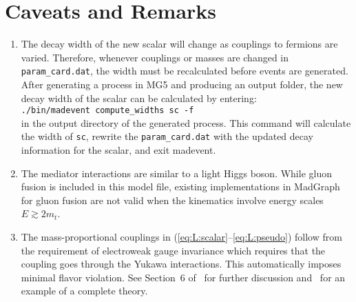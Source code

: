 \documentclass[showpacs,preprintnumbers,amsmath,amssymb]{revtex4}
\begin{document}
\section{Caveats and Remarks}
\begin{enumerate}

\item The decay width of the new scalar will change as couplings to fermions are varied. Therefore, whenever couplings or masses are changed in {\tt param\_card.dat}, the width must be recalculated before events are generated. After generating a process in MG5 and producing an output folder, the new decay width of the scalar can be calculated by entering:\\

{\tt ./bin/madevent compute\_widths sc -f}\\

in the output directory of the generated process. This command will calculate the width of {\tt sc}, rewrite the {\tt param\_card.dat} with the updated decay information for the scalar, and exit madevent.

\item The mediator interactions are similar to a light Higgs boson. While gluon fusion is included in this model file, existing implementations in MadGraph for gluon fusion are not valid when the kinematics involve energy scales $E \gtrsim 2m_t$.

\item The mass-proportional couplings in (\ref{eq:L:scalar}--\ref{eq:L:pseudo}) follow from the requirement of electroweak gauge invariance which requires that the coupling goes through the Yukawa interactions. This automatically imposes minimal flavor violation. See Section~6 of~\cite{Abdullah:2014lla} for further discussion and~\cite{Ipek:2014gua} for an example of a complete theory.


\end{enumerate}
\end{document}
